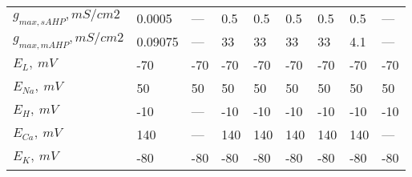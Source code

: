 {\begin{longtable}{lllllllll}
$g_{max, sAHP}, mS/cm2 $ &   0.0005 &    --- &       0.5 &       0.5 &       0.5 &     0.5 &     0.5 &    --- \\
$ g_{max, mAHP}, mS/cm2 $ &  0.09075 &    --- &        33 &        33 &        33 &      33 &     4.1 &    --- \\
$E_L, \ mV$ &      -70 &    -70 &       -70 &       -70 &       -70 &     -70 &     -70 &    -70 \\
$ E_{Na},\ mV$ &       50 &     50 &        50 &        50 &        50 &      50 &      50 &     50 \\
$E_H,\ mV$ &      -10 &    --- &       -10 &       -10 &       -10 &     -10 &     -10 &    -10 \\
$E_{Ca},\ mV$ &      140 &    --- &       140 &       140 &       140 &     140 &     140 &    --- \\
$E_K,\ mV$ &      -80 &    -80 &       -80 &       -80 &       -80 &     -80 &     -80 &    -80 \\


\end{longtable}
}